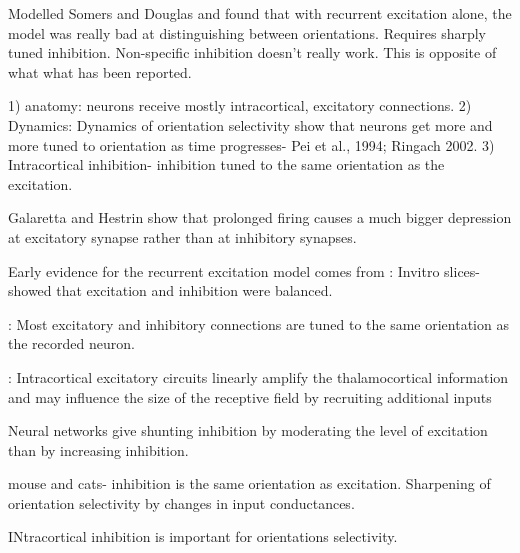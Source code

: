 \cite{Carandini1997} Modelled Somers and Douglas and found that with recurrent excitation alone, the model was really bad at distinguishing between orientations. Requires sharply tuned inhibition. Non-specific inhibition doesn't really work. This is opposite of what what has been reported. 


1) anatomy: neurons receive mostly intracortical, excitatory connections. 
2) Dynamics: Dynamics of orientation selectivity show that neurons get more and more tuned to orientation as time progresses- Pei et al., 1994; Ringach 2002. 
3) Intracortical inhibition- inhibition tuned to the same orientation as the excitation.

\cite{Nelson1998} Galaretta and Hestrin show that prolonged firing causes a much bigger depression at excitatory synapse rather than at inhibitory synapses.

Early evidence for the recurrent excitation model comes from 
\cite{Shu2003}: Invitro slices- showed that excitation and inhibition were balanced. 

\cite{Monier2003}: Most excitatory and inhibitory connections are tuned to the same orientation as the recorded neuron.

\cite{Li2013}: Intracortical excitatory circuits linearly amplify the thalamocortical information and may influence the size of the receptive field by recruiting additional inputs

\cite{Sato2016} Neural networks give shunting inhibition by moderating the level of excitation than by increasing inhibition.

\cite{Tan2011a} mouse and cats- inhibition is the same orientation as excitation. Sharpening of orientation selectivity by changes in input conductances.

\cite{Shapley2007} INtracortical inhibition is important for orientations selectivity.